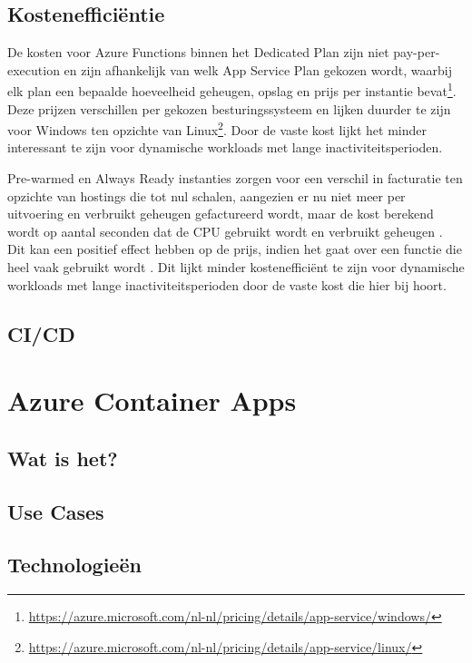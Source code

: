 \subsection{Kostenefficiëntie}

De kosten voor Azure Functions binnen het Dedicated Plan zijn niet pay-per-execution en zijn afhankelijk van welk App Service Plan gekozen wordt, waarbij elk plan een bepaalde hoeveelheid geheugen, opslag en prijs per instantie bevat\footnote{\label{af:pricing-windows}\url{https://azure.microsoft.com/nl-nl/pricing/details/app-service/windows/}}. Deze prijzen verschillen per gekozen besturingssysteem en lijken duurder te zijn voor Windows ten opzichte van Linux\footnote{\label{af:pricing-linux}\url{https://azure.microsoft.com/nl-nl/pricing/details/app-service/linux/}}. Door de vaste kost lijkt het minder interessant te zijn voor dynamische workloads met lange inactiviteitsperioden.

Pre-warmed en Always Ready instanties zorgen voor een verschil in facturatie ten opzichte van hostings die tot nul schalen, aangezien er nu niet meer per uitvoering en verbruikt geheugen gefactureerd wordt, maar de kost berekend wordt op aantal seconden dat de CPU gebruikt wordt en verbruikt geheugen \autocite{Kettner2022}. Dit kan een positief effect hebben op de prijs, indien het gaat over een functie die heel vaak gebruikt wordt \autocite{Kettner2022}. Dit lijkt minder kostenefficiënt te zijn voor dynamische workloads met lange inactiviteitsperioden door de vaste kost die hier bij hoort.

\subsection{CI/CD}

\section{Azure Container Apps}

\subsection{Wat is het?}

\subsection{Use Cases}

\subsection{Technologieën}

